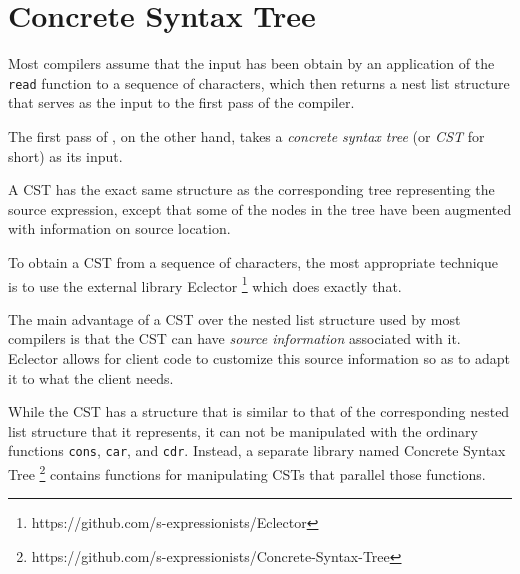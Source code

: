 \chapter{Concrete Syntax Tree}

Most \commonlisp{} compilers assume that the input has been obtain by
an application of the \commonlisp{} \texttt{read} function to a
sequence of characters, which then returns a nest list structure that
serves as the input to the first pass of the compiler.

The first pass of \sysname{}, on the other hand, takes a
\emph{concrete syntax tree} (or \emph{CST} for short) as its input.  

A CST has the exact same structure as the corresponding tree
representing the source expression, except that some of the nodes in
the tree have been augmented with information on source location.

To obtain a CST from a sequence of characters, the most appropriate
technique is to use the external library
Eclector%
\footnote{https://github.com/s-expressionists/Eclector}
which does exactly that.

The main advantage of a CST over the nested list structure used by
most compilers is that the CST can have \emph{source information}
associated with it.  Eclector allows for client code to customize this
source information so as to adapt it to what the client needs.

While the CST has a structure that is similar to that of the
corresponding nested list structure that it represents, it can not be
manipulated with the ordinary \commonlisp{} functions \texttt{cons},
\texttt{car}, and \texttt{cdr}.  Instead, a separate library named
Concrete Syntax Tree%
\footnote{https://github.com/s-expressionists/Concrete-Syntax-Tree}
contains functions for manipulating CSTs that parallel those
\commonlisp{} functions.
